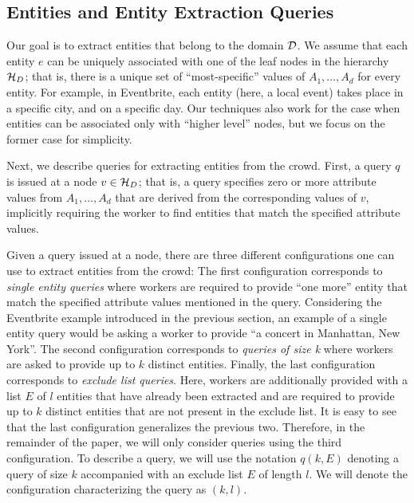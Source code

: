 \subsection{Entities and Entity Extraction Queries}
\label{sec:queries}

 Our goal is to extract entities that belong to the domain $\mathcal{D}$. We assume that each entity $e$ can be uniquely associated with one of the leaf nodes in the hierarchy $\mathcal{H}_D$; that is, there is a unique set of ``most-specific'' values of $A_1, \ldots, A_d$ for every entity. For example, in Eventbrite, each entity (here, a local event) takes place in a specific city, and on a specific day. Our techniques also work for the case when entities can be associated only with ``higher level'' nodes, but we focus on the former case for simplicity. 

 Next, we describe queries for extracting entities from the crowd. First, a query $q$ is issued at a node $v \in \mathcal{H}_D$; that is, a query specifies zero or more attribute values from $A_1, \ldots, A_d$ that are derived from the corresponding values of $v$, implicitly requiring the worker to find entities that match the specified attribute values.  

Given a query issued at a node, there are three different configurations one can use to extract entities from the crowd: The first configuration corresponds to {\em single entity queries} where workers are required to provide ``one more'' entity that match the specified attribute values mentioned in the query. Considering the Eventbrite example introduced in the previous section, an example of a single entity query would be asking a worker to provide ``a concert in Manhattan, New York''. The second configuration corresponds to {\em queries of size k} where workers are asked to provide up to $k$ distinct entities. Finally, the last configuration corresponds to {\em exclude list queries}. Here,  workers are additionally provided with a list $E$ of $l$ entities that have already been extracted and are required to provide up to $k$ distinct entities that are not present in the exclude list. It is easy to see that the last configuration generalizes the previous two. Therefore, in the remainder of the paper, we will only consider queries using the third configuration. To describe a query, we will use the notation $q(k,E)$ denoting a query of size $k$ accompanied with an exclude list $E$ of length $l$. We will denote the configuration characterizing the query as $(k,l)$. 

